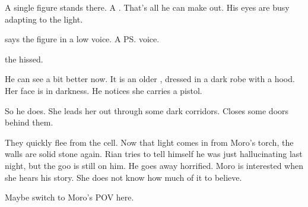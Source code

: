 
A single figure stands there. 
A \scatha. 
That's all he can make out. 
His eyes are busy adapting to the light. 

 says the figure in a low voice. 
A \ps{\sphyle} voice.





the \scatha hissed.



He can see a bit better now. 
It is an older \sphyle, dressed in a dark robe with a hood. 
Her face is in darkness. 
He notices she carries a pistol. 


So he does. 
She leads her out through some dark corridors. 
Closes some doors behind them. 

They quickly flee from the cell. 
Now that light comes in from Moro's torch, the walls are solid stone again.
Rian tries to tell himself he was just hallucinating last night, but the goo is still on him. 
He goes away horrified. 
Moro is interested when she hears his story.
She does not know how much of it to believe. 





\begin{comment}
  \section{Moro and Rian talk}
\end{comment}
\new
Maybe switch to Moro's POV here.


